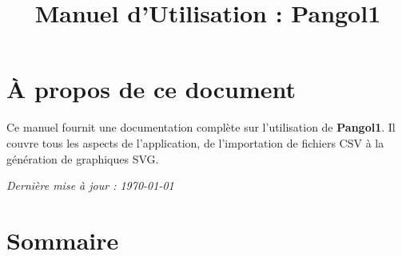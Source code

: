 \documentclass[11pt, a4paper]{article}
\title{Manuel d'Utilisation : Pangol1}
\author{}
\date{}
\begin{document}
\maketitle

\section*{À propos de ce document}
Ce manuel fournit une documentation complète sur l'utilisation de \textbf{Pangol1}. Il couvre tous les aspects de l'application, de l'importation de fichiers CSV à la génération de graphiques SVG.

\vspace{2ex}
\noindent
{\small \textit{Dernière mise à jour : \today}}

\newpage

\section*{Sommaire}
\end{document}
